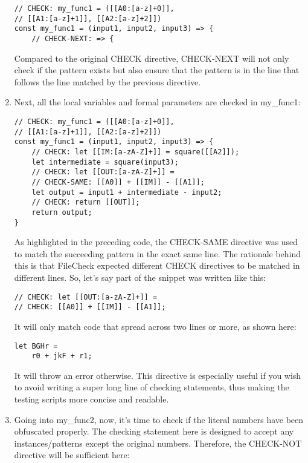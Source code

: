 \begin{enumerate}
\begin{lstlisting}[style=styleJavaScript]
// CHECK: my_func1 = ([[A0:[a-z]+0]],
// [[A1:[a-z]+1]], [[A2:[a-z]+2]])
const my_func1 = (input1, input2, input3) => {
	// CHECK-NEXT: => {
\end{lstlisting}

Compared to the original CHECK directive, CHECK-NEXT will not only check if the pattern exists but also ensure that the pattern is in the line that follows the line matched by the previous directive.

\item Next, all the local variables and formal parameters are checked in my\_func1:

\begin{lstlisting}[style=styleJavaScript]
// CHECK: my_func1 = ([[A0:[a-z]+0]],
// [[A1:[a-z]+1]], [[A2:[a-z]+2]])
const my_func1 = (input1, input2, input3) => {
	// CHECK: let [[IM:[a-zA-Z]+]] = square([[A2]]);
	let intermediate = square(input3);
	// CHECK: let [[OUT:[a-zA-Z]+]] =
	// CHECK-SAME: [[A0]] + [[IM]] - [[A1]];
	let output = input1 + intermediate - input2;
	// CHECK: return [[OUT]];
	return output;
}
\end{lstlisting}

As highlighted in the preceding code, the CHECK-SAME directive was used to match the succeeding pattern in the exact same line. The rationale behind this is that FileCheck expected different CHECK directives to be matched in different lines. So, let's say part of the snippet was written like this:

\begin{lstlisting}[style=styleJavaScript]
// CHECK: let [[OUT:[a-zA-Z]+]] =
// CHECK: [[A0]] + [[IM]] - [[A1]];
\end{lstlisting}

It will only match code that spread across two lines or more, as shown here:

\begin{lstlisting}[style=styleJavaScript]
let BGHr =
	r0 + jkF + r1;
\end{lstlisting}

It will throw an error otherwise. This directive is especially useful if you wish to avoid writing a super long line of checking statements, thus making the testing scripts more concise and readable.

\item Going into my\_func2, now, it's time to check if the literal numbers have been obfuscated properly. The checking statement here is designed to accept any instances/patterns except the original numbers. Therefore, the CHECK-NOT directive will be sufficient here:


\end{enumerate}

